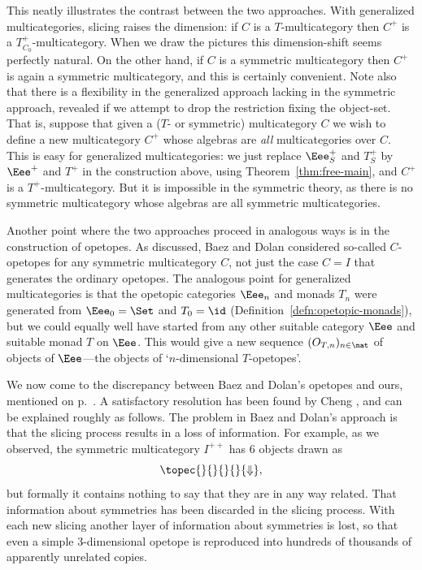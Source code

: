 This neatly illustrates the contrast between the two approaches.  With
generalized multicategories, slicing raises the dimension: if $C$ is a
$T$-multicategory then $C^+$ is a $T^+_{C_0}$-multicategory.  When we draw
the pictures this dimension-shift seems perfectly natural.  On the other
hand, if $C$ is a symmetric multicategory then $C^+$ is again a symmetric
multicategory, and this is certainly convenient.  Note also that there is a
flexibility in the generalized approach lacking in the symmetric approach,
revealed if we attempt to drop the restriction fixing the object-set.  That
is, suppose that given a ($T$- or symmetric) multicategory $C$ we wish to
define a new multicategory%
%
%
%
%
$C^+$ whose algebras are \emph{all}
multicategories over $C$.  This is easy for generalized multicategories: we
just replace $\Eee^+_S$ and $T^+_S$ by $\Eee^+$ and $T^+$ in the
construction above, using Theorem~\ref{thm:free-main}, and $C^+$ is a
$T^+$-multicategory.  But it is impossible in the symmetric theory, as
there is no symmetric multicategory whose algebras are all symmetric
multicategories.

Another point where the two approaches proceed in analogous ways is in the
construction of opetopes.  As discussed, Baez and Dolan considered
so-called $C$-opetopes for any symmetric multicategory $C$, not just the
case $C=I$ that generates the ordinary opetopes.  The analogous point for
generalized multicategories is that the opetopic categories $\Eee_n$ and
monads $T_n$ were generated from $\Eee_0 =\Set$ and $T_0=\id$
(Definition~\ref{defn:opetopic-monads}), but we could equally well have
started from any other suitable category $\Eee$ and suitable monad $T$ on
$\Eee$.  This would give a new sequence $(O_{T,n})_{n\in\nat}$ of objects
of $\Eee$---the objects of `$n$-dimensional $T$-opetopes'.%
%
%
%

We now come to the discrepancy between Baez and Dolan's opetopes and ours,
mentioned on p.~\pageref{p:opetope-discrepancy}.  A satisfactory resolution
has been found by Cheng%
% 
%
%
%
\cite{CheWOM, CheWCO}, and can be explained roughly as follows.  The
problem in Baez and Dolan's approach is that the slicing process results in
a loss of information.  For example, as we observed, the symmetric
multicategory $I^{++}$ has 6%
%
%
objects drawn as
\[
\topec{}{}{}{}{\Downarrow},
\]
but formally it contains nothing to say that they are in any way related.
That information about symmetries has been discarded in the slicing
process.  With each new slicing another layer of information about
symmetries is lost, so that even a simple 3-dimensional opetope is
reproduced into hundreds of thousands of apparently unrelated copies.

